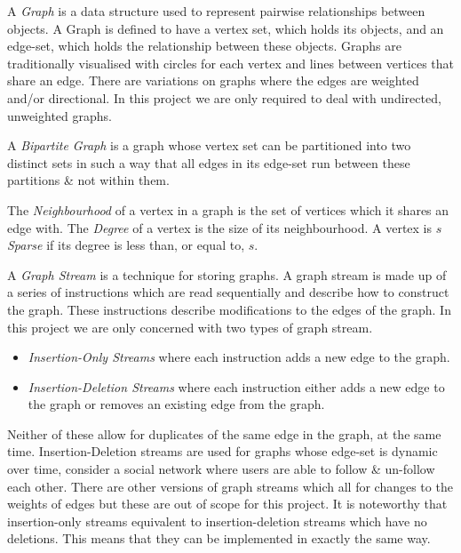 \documentclass[11pt,twoside,a4paper]{report}
\begin{document}
A \textit{Graph} is a data structure used to represent pairwise relationships between objects. A Graph is defined to have a vertex set, which holds its objects, and an edge-set, which holds the relationship between these objects. Graphs are traditionally visualised with circles for each vertex and lines between vertices that share an edge. There are variations on graphs where the edges are weighted and/or directional. In this project we are only required to deal with undirected, unweighted graphs.
\par A \textit{Bipartite Graph} is a graph whose vertex set can be partitioned into two distinct sets in such a way that all edges in its edge-set run between these partitions \& not within them. %
\par The \textit{Neighbourhood} of a vertex in a graph is the set of vertices which it shares an edge with. The \textit{Degree} of a vertex is the size of its neighbourhood. A vertex is $s$ \textit{Sparse} if its degree is less than, or equal to, $s$.
\par A \textit{Graph Stream} is a technique for storing graphs. A graph stream is made up of a series of instructions which are read sequentially and describe how to construct the graph. These instructions describe modifications to the edges of the graph. In this project we are only concerned with two types of graph stream.
\begin{itemize}
	\item \textit{Insertion-Only Streams} where each instruction adds a new edge to the graph.
	\item \textit{Insertion-Deletion Streams} where each instruction either adds a new edge to the graph or removes an existing edge from the graph.
\end{itemize}
Neither of these allow for duplicates of the same edge in the graph, at the same time. Insertion-Deletion streams are used for graphs whose edge-set is dynamic over time, consider a social network where users are able to follow \& un-follow each other. There are other versions of graph streams which all for changes to the weights of edges but these are out of scope for this project. It is noteworthy that insertion-only streams equivalent to insertion-deletion streams which have no deletions. This means that they can be implemented in exactly the same way. %
\end{document}
